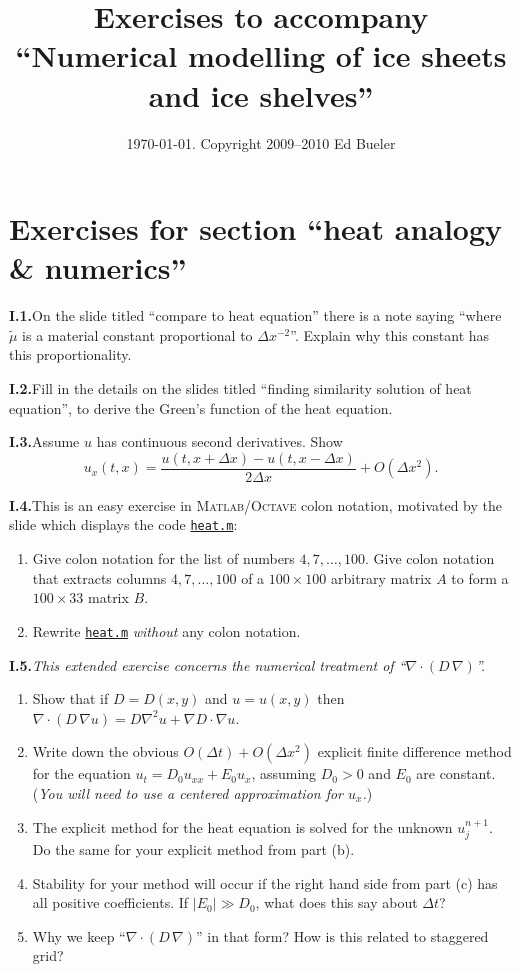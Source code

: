 \documentclass[11pt,final]{amsart}
\newcommand{\grad}{\nabla}
\newcommand{\Div}{\nabla\cdot}
\newcommand{\exer}[2]{\medskip\noindent \textbf{#1.}\quad #2}
\newcommand{\mname}[1]{\href{http://www.dms.uaf.edu/~bueler/karthaus/mfiles/#1}{\texttt{#1}}}
\newcommand{\Matlab}{\textsc{Matlab}\xspace}
\newcommand{\Octave}{\textsc{Octave}\xspace}
\begin{document}
\title{Exercises to accompany \\ ``Numerical modelling of ice sheets and ice shelves''}

\date{\today.  Copyright 2009--2010  Ed Bueler}

\maketitle


\section*{Exercises for section ``heat analogy \& numerics''}

\exer{I.1}{On the slide titled ``compare to heat equation'' there is a note saying ``where $\tilde \mu$ is a material constant proportional to $\Delta x^{-2}$''.  Explain why this constant has this proportionality.}

\exer{I.2}{Fill in the details on the slides titled ``finding similarity solution of heat equation'', to derive the Green's function of the heat equation.}

\exer{I.3}{Assume $u$ has continuous second derivatives.  Show
  $$u_x(t,x) = \frac{u(t,x+\Delta x) - u(t,x-\Delta x)}{2\Delta x} + O(\Delta x^2).$$
}
\exer{I.4}{This is an easy exercise in \Matlab/\Octave colon notation, motivated by the slide which displays the code \mname{heat.m}:
\renewcommand{\labelenumi}{(\alph{enumi})}
\begin{enumerate}
\item Give colon notation for the list of numbers $4,7,\dots,100$.  Give colon notation that extracts columns $4,7,\dots,100$ of a $100 \times 100$ arbitrary matrix $A$ to form a $100 \times 33$ matrix $B$.
\item Rewrite \mname{heat.m} \emph{without} any colon notation.
\end{enumerate}}

\exer{I.5}{\emph{This extended exercise concerns the numerical treatment of ``$\Div\left(D\,\grad\right)$''.} 
\renewcommand{\labelenumi}{(\alph{enumi})}
\begin{enumerate}
\item Show that if $D=D(x,y)$ and $u=u(x,y)$ then $\Div \left(D\, \grad u\right) = D \grad^2 u + \grad D \cdot \grad u$.
\item Write down the obvious $O(\Delta t)+O(\Delta x^2)$ explicit finite difference method for the equation $u_t = D_0 u_{xx} + E_0 u_x$, assuming $D_0>0$ and $E_0$ are constant.  (\emph{You will need to use a centered approximation for $u_x$.})
\item The explicit method for the heat equation is solved for the unknown $u_j^{n+1}$.  Do the same for your explicit method from part (b). 
\item Stability for your method will occur if the right hand side from part (c) has all positive coefficients.  If $|E_0| \gg D_0$, what does this say about $\Delta t$?
\item Why we keep ``$\Div\left(D\,\grad\right)$'' in that form?  How is this related to staggered grid?
\end{enumerate}
}
\end{document}
